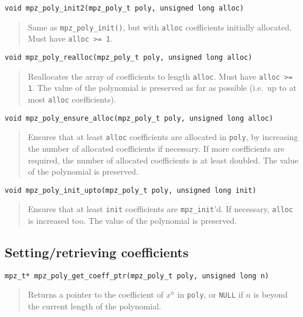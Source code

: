 \documentclass[a4paper,10pt]{article}
\newcommand{\code}{\lstinline}
\begin{document}
\begin{lstlisting}
void mpz_poly_init2(mpz_poly_t poly, unsigned long alloc)
\end{lstlisting}
\begin{quote}
Same as \code{mpz_poly_init()}, but with \code{alloc} coefficients initially allocated. Must have \code{alloc >= 1}.
\end{quote}

\begin{lstlisting}
void mpz_poly_realloc(mpz_poly_t poly, unsigned long alloc)
\end{lstlisting}
\begin{quote}
Reallocates the array of coefficients to length \code{alloc}. Must have \code{alloc >= 1}. The value of the polynomial is preserved as far as possible (i.e.~up to at most \code{alloc} coefficients).
\end{quote}

\begin{lstlisting}
void mpz_poly_ensure_alloc(mpz_poly_t poly, unsigned long alloc)
\end{lstlisting}
\begin{quote}
Ensures that at least \code{alloc} coefficients are allocated in \code{poly}, by increasing the number of allocated coefficients if necessary. If more coefficients are required, the number of allocated coefficients is at least doubled. The value of the polynomial is preserved.
\end{quote}


\begin{lstlisting}
void mpz_poly_init_upto(mpz_poly_t poly, unsigned long init)
\end{lstlisting}
\begin{quote}
Ensures that at least \code{init} coefficients are \code{mpz_init}'d. If necessary, \code{alloc} is increased too. The value of the polynomial is preserved.
\end{quote}



\subsection{Setting/retrieving coefficients}

\begin{lstlisting}
mpz_t* mpz_poly_get_coeff_ptr(mpz_poly_t poly, unsigned long n)
\end{lstlisting}
\begin{quote}
Returns a pointer to the coefficient of $x^n$ in \code{poly}, or \code{NULL} if $n$ is beyond the current length of the polynomial.
\end{quote}
\end{document}
